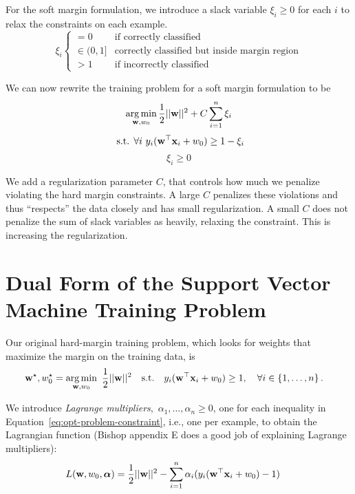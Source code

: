 \documentclass[11pt,letterpaper]{article}
\begin{document}
\noindent For the soft margin formulation, we introduce a slack variable $\xi_i
\geq 0$ for each $i$ to relax the constraints on each example.
%
$$
\xi_i \begin{cases} 
      =0 & \text{if correctly classified} \\
      \in (0,1] & \text{correctly classified but inside margin
        region}\\
      >1 & \text{if incorrectly classified}
   \end{cases}
$$

\noindent We can now rewrite
the training problem
for a soft margin formulation to be 
%
$$
\argmin_{\boldw, w_0} \frac{1}{2}{||\boldw||^2} + C\sum_{i=1}^n \xi_i $$
$$\text{ s.t. }\forall i\text{ } y_i(\mathbf{w}^\top\mathbf{x}_i+w_0) \geq 1 - \xi_i$$
$$ \xi_i \geq 0$$


\noindent We add a regularization parameter $C$, that controls how much we
penalize violating the hard margin constraints. 
A large $C$ penalizes these violations and thus
``respects'' the data closely and has small regularization.  A small
$C$ does not penalize the sum of slack variables as heavily, relaxing
the constraint. This is increasing the regularization.

\section{Dual Form of the Support Vector Machine Training Problem}

\noindent{}
\medskip

\noindent Our original hard-margin training problem, which looks for weights
that maximize the margin on the training data, is
%
\begin{align}
\label{eq:opt-problem-constraint}
\boldw^\star, w_0^\star &=
\argmin_{\boldw,w_0}\ \frac{1}{2}||\boldw||^2 \quad \mbox{s.t.}
\quad y_i(\boldw^\top\boldx_i+w_0)\geq 1, \quad \forall i\in
\{1,\ldots,n\}\,.
\end{align}

\noindent We introduce {\em Lagrange multipliers},~${\alpha_1, \ldots, \alpha_n \geq 0}$, 
one for each inequality in Equation~\ref{eq:opt-problem-constraint}, i.e., one per example, to obtain the Lagrangian function (Bishop appendix E does a good job of explaining Lagrange multipliers):
\begin{align}
L(\mathbf{w},w_0,\boldsymbol{\alpha}) &= \frac{1}{2}||\mathbf{w}||^2
-\sum_{i=1}^n\alpha_i(y_i(\mathbf{w}^\top\mathbf{x}_i+w_0)-1)\,
\end{align}
\end{document}
